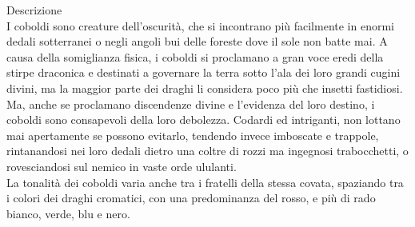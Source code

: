 \begin{multicols}{2}
Descrizione\\
I coboldi sono creature dell’oscurità, che si incontrano più facilmente in enormi dedali sotterranei o negli angoli bui delle foreste dove il sole non batte mai. A causa della somiglianza fisica, i coboldi si proclamano a gran voce eredi della stirpe draconica e destinati a governare la terra sotto l’ala dei loro grandi cugini divini, ma la maggior parte dei draghi li considera poco più che insetti fastidiosi. Ma, anche se proclamano discendenze divine e l’evidenza del loro destino, i coboldi sono consapevoli della loro debolezza. Codardi ed intriganti, non lottano mai apertamente se possono evitarlo, tendendo invece imboscate e trappole, rintanandosi nei loro dedali dietro una coltre di rozzi ma ingegnosi trabocchetti, o rovesciandosi sul nemico in vaste orde ululanti.\\
La tonalità dei coboldi varia anche tra i fratelli della stessa covata, spaziando tra i colori dei draghi cromatici, con una predominanza del rosso, e più di rado bianco, verde, blu e nero.\\


\end{multicols}
